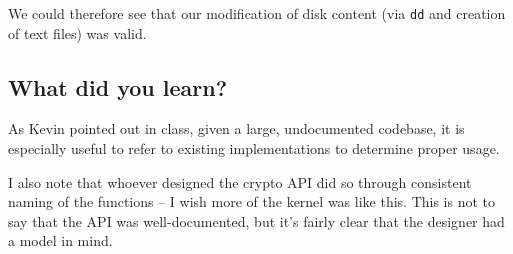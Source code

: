 \documentclass[11pt,letterpaper]{article}
\begin{document}
We could therefore see that our modification of disk content (via \verb|dd| and
creation of text files) was valid.


\subsection*{What did you learn?}

As Kevin pointed out in class, given a large, undocumented codebase, it is
especially useful to refer to existing implementations to determine proper
usage.

I also note that whoever designed the crypto API did so through consistent
naming of the functions -- I wish more of the kernel was like this. This is not
to say that the API was well-documented, but it's fairly clear that the
designer had a model in mind.
\end{document}
